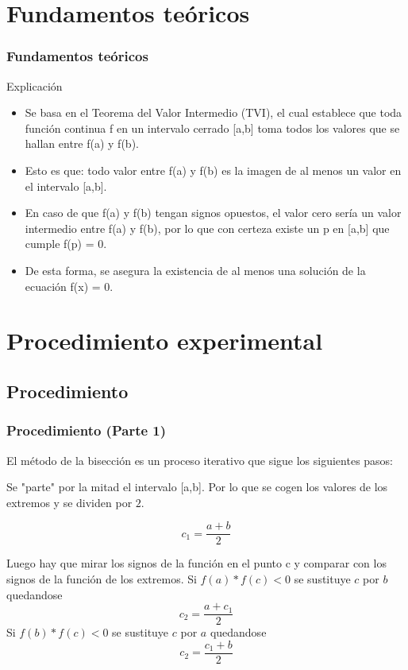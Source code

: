 \documentclass{beamer}
\begin{document}
\section{Fundamentos teóricos}
\begin{frame}

\frametitle{Fundamentos teóricos}

\begin{block}{Explicación}
  \begin{itemize}
  \item
    Se basa en el Teorema del Valor Intermedio (TVI), el cual establece que toda función continua f en un intervalo cerrado [a,b] toma todos los valores que se hallan entre f(a) y f(b). 
  \pause

  \item
    Esto es que: todo valor entre f(a) y f(b) es la imagen de al menos un valor en el intervalo [a,b]. 
  \pause

  \item
    En caso de que f(a) y f(b) tengan signos opuestos, el valor cero sería un valor intermedio entre f(a) y f(b), por lo que con certeza existe un p en [a,b] que cumple f(p) = 0. 
  \pause

  \item
    De esta forma, se asegura la existencia de al menos una solución de la ecuación f(x) = 0.
  \end{itemize}
\end{block}

\end{frame}

\section{Procedimiento experimental}

\subsection{Procedimiento}
\begin{frame}
\frametitle{Procedimiento (Parte 1)}
El método de la bisección es un proceso iterativo que sigue los siguientes pasos:
 \item
  Se "parte" por la mitad el intervalo [a,b]. Por lo que se cogen los valores de los extremos y se dividen por $2$.
  \begin{center}
   $$ c_1=\frac{a+b}{2} $$
  \end{center}
 \pause

 \item
  Luego hay que mirar los signos de la función en el punto c y comparar con los signos de la función de los extremos.
    \Item
     Si $f(a)*f(c)<0$ se sustituye $c$ por $b$ quedandose $$c_2=\frac{a+c_1}{2}$$
    \Item
     Si $f(b)*f(c)<0$ se sustituye $c$ por $a$ quedandose $$c_2=\frac{c_1+b}{2}$$
\end{frame}
\end{document}
